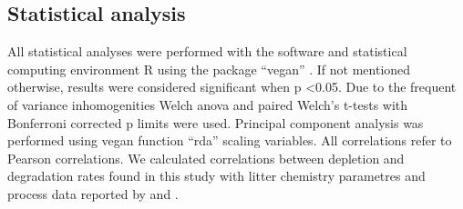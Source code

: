 \documentclass[authoryear,preprint,review,12pt]{elsarticle}
\begin{document}
                                                                                                                                                                                                                                                                                                                                                                                                                                                                                                                                                                                                                                                                                                                                                                                                                                                                                                                                                                                                                                                                                                                              \subsection{Statistical analysis}
                                                                                                                                                                                                                                                                                                                                                                                                                                                                                                                                                                                                                                                                                                                                                                                                                                                                                                                                                                                                                                                                                                                              All statistical analyses were performed with the software and statistical computing environment R using the package ``vegan'' \citep{Oksanen2011}. If not mentioned otherwise, results were considered significant when p \textless  0.05. Due to the frequent of variance inhomogenities Welch anova and paired Welch's t-tests with Bonferroni corrected p limits were used. Principal component analysis was performed using vegan function ``rda'' scaling variables. All correlations refer to Pearson correlations. We calculated correlations between depletion and degradation rates found in this study with litter chemistry parametres and process data reported by \cite{Mooshammer2011} and \cite{Leitner2011}.
\end{document}
